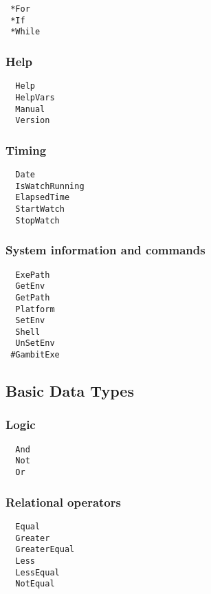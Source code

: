 \begin{verbatim}
 *For
 *If
 *While
\end{verbatim}

\subsubsection{Help}

\begin{verbatim}
  Help 
  HelpVars 
  Manual 
  Version 
\end{verbatim}


\subsubsection{Timing}

\begin{verbatim}
  Date 
  IsWatchRunning 
  ElapsedTime 
  StartWatch 
  StopWatch 
\end{verbatim}

\subsubsection{System information and commands}

\begin{verbatim}
  ExePath 
  GetEnv 
  GetPath 
  Platform 
  SetEnv 
  Shell 
  UnSetEnv 
 #GambitExe 
\end{verbatim}

\subsection{Basic Data Types}

\subsubsection{Logic}

\begin{verbatim}
  And 
  Not 
  Or 
\end{verbatim}

\subsubsection{Relational operators}

\begin{verbatim}
  Equal 
  Greater 
  GreaterEqual 
  Less 
  LessEqual 
  NotEqual 
\end{verbatim}

